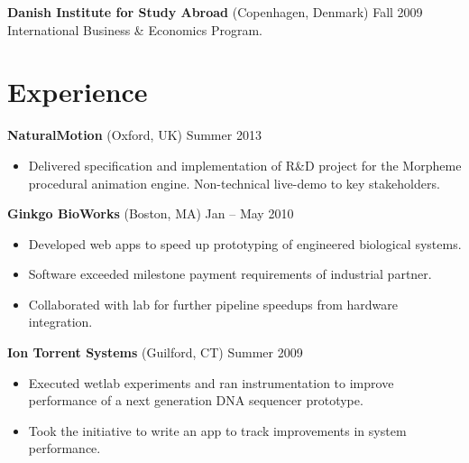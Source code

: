 \documentclass[margin]{res}
\newcommand{\locdatesubsection}[3]{\textbf{#1} (#2) \hfill #3}
\begin{document}
\begin{sloppypar}
\begin{resume}
\locdatesubsection{Danish Institute for Study Abroad}{Copenhagen, Denmark}{Fall 2009}\\
International Business \& Economics Program.

\section{Experience}
\locdatesubsection{NaturalMotion}{Oxford, UK}{Summer 2013}
\begin{itemize}
\item Delivered specification and implementation of R\&D project for the Morpheme procedural animation engine. Non-technical live-demo to key stakeholders.
\end{itemize}

\locdatesubsection{Ginkgo BioWorks}{Boston, MA}{Jan -- May 2010}
\begin{itemize}
\item Developed web apps to speed up prototyping of engineered biological systems. 
\item Software exceeded milestone payment requirements of industrial partner.
\item Collaborated with lab for further pipeline speedups from hardware integration.
\end{itemize}

\locdatesubsection{Ion Torrent Systems}{Guilford, CT}{Summer 2009}
\begin{itemize}
\item Executed wetlab experiments and ran instrumentation to improve performance of a next generation DNA sequencer prototype.
\item Took the initiative to write an app to track improvements in system performance.
\end{itemize}


\end{resume}
\end{sloppypar}
\end{document}
